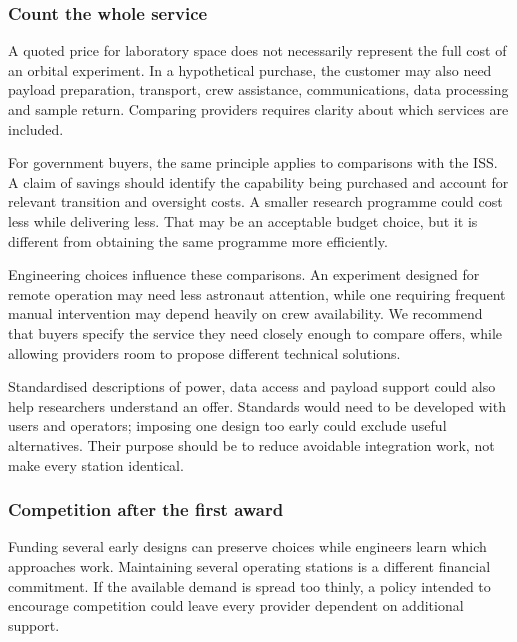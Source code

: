 \documentclass[11pt,letterpaper]{article}
\begin{document}
\hypertarget{count-the-whole-service}{%
\subsubsection{Count the whole service}\label{count-the-whole-service}}

A quoted price for laboratory space does not necessarily represent the
full cost of an orbital experiment. In a hypothetical purchase, the
customer may also need payload preparation, transport, crew assistance,
communications, data processing and sample return. Comparing providers
requires clarity about which services are included.

For government buyers, the same principle applies to comparisons with
the ISS. A claim of savings should identify the capability being
purchased and account for relevant transition and oversight costs. A
smaller research programme could cost less while delivering less. That
may be an acceptable budget choice, but it is different from obtaining
the same programme more efficiently.

Engineering choices influence these comparisons. An experiment designed
for remote operation may need less astronaut attention, while one
requiring frequent manual intervention may depend heavily on crew
availability. We recommend that buyers specify the service they need
closely enough to compare offers, while allowing providers room to
propose different technical solutions.

Standardised descriptions of power, data access and payload support
could also help researchers understand an offer. Standards would need to
be developed with users and operators; imposing one design too early
could exclude useful alternatives. Their purpose should be to reduce
avoidable integration work, not make every station identical.

\hypertarget{competition-after-the-first-award}{%
\subsubsection{Competition after the first
award}\label{competition-after-the-first-award}}

Funding several early designs can preserve choices while engineers learn
which approaches work. Maintaining several operating stations is a
different financial commitment. If the available demand is spread too
thinly, a policy intended to encourage competition could leave every
provider dependent on additional support.
\end{document}
